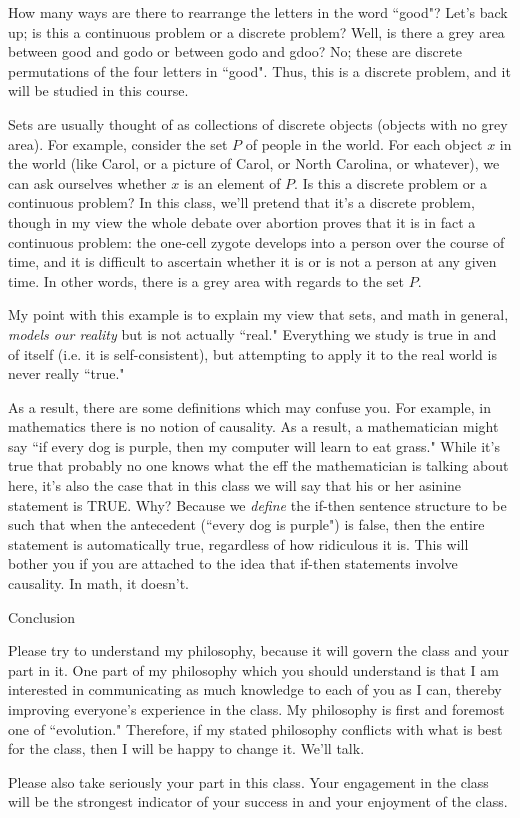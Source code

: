 \documentclass[12pt]{letter}
\begin{document}
How many ways are there to rearrange the letters in the word ``good"?  
Let's back up; is this a continuous problem or a discrete problem?  Well, 
is there a grey area between good and godo or between godo and gdoo?  No; 
these are discrete permutations of the four letters in ``good".  Thus, 
this is a discrete problem, and it will be studied in this course.

Sets are usually thought of as collections of discrete objects (objects 
with no grey area). For example, consider the set $P$ of people in the 
world.  For each object $x$ in the world (like Carol, or a picture of 
Carol, or North Carolina, or whatever), we can ask ourselves whether $x$ 
is an element of $P$.  Is this a discrete problem or a continuous problem?  
In this class, we'll pretend that it's a discrete problem, though in my 
view the whole debate over abortion proves that it is in fact a continuous 
problem: the one-cell zygote develops into a person over the course of 
time, and it is difficult to ascertain whether it is or is not a person at 
any given time.  In other words, there is a grey area with regards to the 
set $P$.

My point with this example is to explain my view that sets, and math in 
general, {\em models our reality} but is not actually ``real."  
Everything we study is true in and of itself (i.e. it is self-consistent), 
but attempting to apply it to the real world is never really ``true."

As a result, there are some definitions which may confuse you.  For 
example, in mathematics there is no notion of causality.  As a result, a 
mathematician might say ``if every dog is purple, then my computer will 
learn to eat grass."  While it's true that probably no one knows what the 
eff the mathematician is talking about here, it's also the case that in 
this class we will say that his or her asinine statement is TRUE.  Why?  
Because we {\em define} the if-then sentence structure to be such that 
when the antecedent (``every dog is purple") is false, then the entire 
statement is automatically true, regardless of how ridiculous it is.  
This will bother you if you are attached to the idea that if-then 
statements involve causality.  In math, it doesn't.

\vspace{.5in}

\Large Conclusion\normalsize

Please try to understand my philosophy, because it will govern the class 
and your part in it.  One part of my philosophy which you should 
understand is that I am interested in communicating as much knowledge to 
each of you as I can, thereby improving everyone's experience in the 
class.  My philosophy is first and foremost one of ``evolution."  
Therefore, 
if my stated philosophy conflicts with what is best for the class, then I 
will be happy to change it.  We'll talk.

Please also take seriously your part in this class.  Your engagement in 
the class will be the strongest indicator of your success in and your 
enjoyment of the class.
\end{document}
